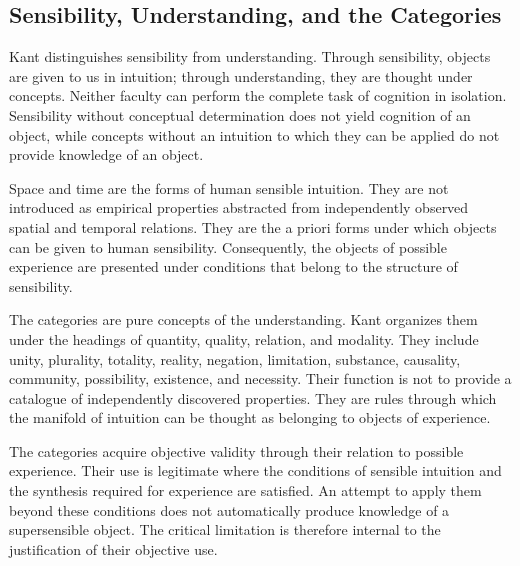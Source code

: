 \subsection{Sensibility, Understanding, and the Categories}
\label{subsec:ch08-kant-faculties}

\label{para:VS.B01.P01.C08.S10.SS04.P001}

Kant distinguishes sensibility from understanding.
Through sensibility, objects are given to us in
intuition; through understanding, they are thought
under concepts. Neither faculty can perform the
complete task of cognition in isolation. Sensibility
without conceptual determination does not yield
cognition of an object, while concepts without an
intuition to which they can be applied do not provide
knowledge of an object.
\cite{KantCritiquePureReason}

\label{para:VS.B01.P01.C08.S10.SS04.P002}

Space and time are the forms of human sensible intuition.
They are not introduced as empirical properties
abstracted from independently observed spatial and
temporal relations. They are the a priori forms under
which objects can be given to human sensibility.
Consequently, the objects of possible experience
are presented under conditions that belong to the
structure of sensibility.

\label{para:VS.B01.P01.C08.S10.SS04.P003}

The categories are pure concepts of the understanding.
Kant organizes them under the headings of quantity,
quality, relation, and modality. They include unity,
plurality, totality, reality, negation, limitation,
substance, causality, community, possibility,
existence, and necessity. Their function is not
to provide a catalogue of independently discovered
properties. They are rules through which the manifold
of intuition can be thought as belonging to objects
of experience.
\cite{KantCritiquePureReason}

\label{para:VS.B01.P01.C08.S10.SS04.P004}

The categories acquire objective validity through
their relation to possible experience. Their use is
legitimate where the conditions of sensible intuition
and the synthesis required for experience are satisfied.
An attempt to apply them beyond these conditions
does not automatically produce knowledge of a
supersensible object. The critical limitation is
therefore internal to the justification of their
objective use.

